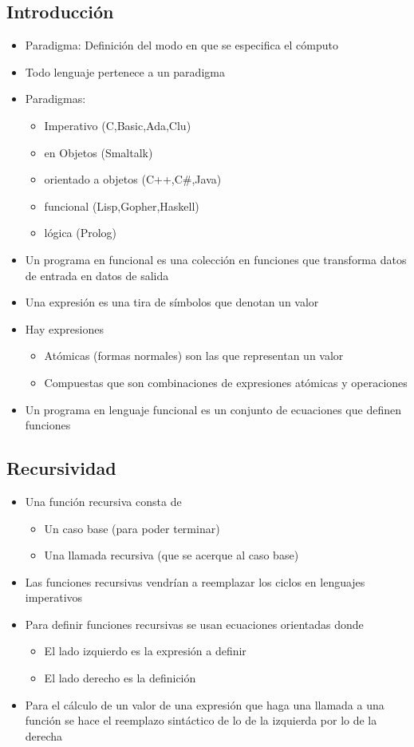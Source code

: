 \documentclass[a4paper,10pt]{article}
\begin{document}
\subsection{Introducción}
	\begin{itemize}
		\item Paradigma: Definición del modo en que se especifica el cómputo
		\item Todo lenguaje pertenece a un paradigma
		\item Paradigmas: 		
		\begin{itemize}
			\item Imperativo (C,Basic,Ada,Clu)
			\item en Objetos (Smaltalk)
			\item orientado a objetos (C++,C\#,Java)
			\item funcional (Lisp,Gopher,Haskell)
			\item lógica (Prolog)
		\end{itemize}
		\item Un programa en funcional es una colección en funciones que transforma datos de entrada en datos de salida
		\item Una expresión es una tira de símbolos que denotan un valor
		\item Hay expresiones
		\begin{itemize}
			\item Atómicas (formas normales) son las que representan un valor
			\item Compuestas que son combinaciones de expresiones atómicas y operaciones
		\end{itemize}
		\item Un programa en lenguaje funcional es un conjunto de ecuaciones que definen funciones
	\end{itemize}
\subsection{Recursividad}
	\begin{itemize}
		\item Una función recursiva consta de 
		\begin{itemize}
			\item Un caso base (para poder terminar)
			\item Una llamada recursiva (que se acerque al caso base)
		\end{itemize}
		\item Las funciones recursivas vendrían a reemplazar los ciclos en lenguajes imperativos
		\item Para definir funciones recursivas se usan ecuaciones orientadas donde
		\begin{itemize}
			\item El lado izquierdo es la expresión a definir
			\item El lado derecho es la definición
		\end{itemize}
		\item Para el cálculo de un valor de una expresión que haga una llamada a una función se hace el reemplazo sintáctico de lo de la izquierda por lo de la derecha
	\end{itemize}
\end{document}
